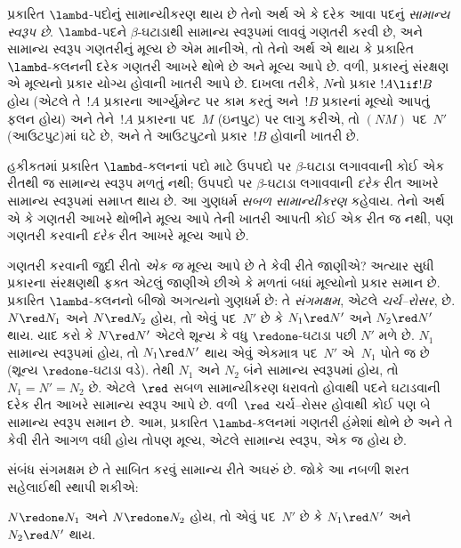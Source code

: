 પ્રકારિત $\lambd$-પદોનું સામાન્યીકરણ થાય છે તેનો
અર્થ એ કે દરેક આવા પદનું \emph{સામાન્ય સ્વરૂપ છે}.
$\lambd$-પદને $\beta$-ઘટાડાથી સામાન્ય સ્વરૂપમાં
લાવવું ગણતરી કરવી છે, અને સામાન્ય સ્વરૂપ
ગણતરીનું મૂલ્ય છે એમ માનીએ, તો તેનો અર્થ
એ થાય કે પ્રકારિત $\lambd$-કલનની દરેક ગણતરી
આખરે થોભે છે અને મૂલ્ય આપે છે. વળી,
પ્રકારનું સંરક્ષણ એ મૂલ્યનો પ્રકાર યોગ્ય
હોવાની ખાતરી આપે છે. દાખલા તરીકે, $N$નો
પ્રકાર $!A \lif !B$ હોય (એટલે તે~$!A$
પ્રકારના આર્ગ્યુમેન્ટ પર કામ કરતું અને~$!B$
પ્રકારનાં મૂલ્યો આપતું ફલન હોય) અને તેને~$!A$
પ્રકારના પદ~$M$ (ઇનપુટ) પર લાગુ કરીએ,
તો $(NM)$ પદ~$N'$ (આઉટપુટ)માં ઘટે છે,
અને તે આઉટપુટનો પ્રકાર~$!B$ હોવાની ખાતરી છે.


હકીકતમાં પ્રકારિત $\lambd$-કલનનાં પદો માટે
ઉપપદો પર $\beta$-ઘટાડા લગાવવાની કોઈ એક
રીતથી જ સામાન્ય સ્વરૂપ મળતું નથી; ઉપપદો
પર $\beta$-ઘટાડા લગાવવાની \emph{દરેક}
રીત આખરે સામાન્ય સ્વરૂપમાં સમાપ્ત થાય છે.
આ ગુણધર્મ \emph{સબળ સામાન્યીકરણ} કહેવાય.
તેનો અર્થ એ કે ગણતરી આખરે થોભીને મૂલ્ય
આપે તેની ખાતરી આપતી કોઈ એક રીત જ નથી,
પણ ગણતરી કરવાની \emph{દરેક} રીત
આખરે મૂલ્ય આપે છે.

ગણતરી કરવાની જુદી રીતો \emph{એક જ} મૂલ્ય
આપે છે તે કેવી રીતે જાણીએ? અત્યાર સુધી
પ્રકારના સંરક્ષણથી ફક્ત એટલું જાણીએ છીએ
કે મળતાં બધાં મૂલ્યોનો પ્રકાર સમાન છે.
પ્રકારિત $\lambd$-કલનનો બીજો અગત્યનો
ગુણધર્મ છે: તે \emph{સંગમક્ષમ}, એટલે
\emph{ચર્ચ--રોસર}, છે.
$N \red N_1$ અને $N \red N_2$ હોય,
તો એવું પદ~$N'$ છે કે $N_1 \red N'$
અને $N_2 \red N'$ થાય. યાદ કરો કે
$N \red N'$ એટલે શૂન્ય કે વધુ
$\redone$-ઘટાડા પછી $N'$ મળે છે.
$N_1$ સામાન્ય સ્વરૂપમાં હોય, તો
$N_1 \red N'$ થાય એવું એકમાત્ર પદ~$N'$
એ~$N_1$ પોતે જ છે (શૂન્ય
$\redone$-ઘટાડા વડે). તેથી $N_1$ અને
$N_2$ બંને સામાન્ય સ્વરૂપમાં હોય, તો
$N_1 = N' = N_2$ છે. એટલે~$\red$
સબળ સામાન્યીકરણ ધરાવતો હોવાથી પદને
ઘટાડવાની દરેક રીત આખરે સામાન્ય સ્વરૂપ આપે છે.
વળી~$\red$ ચર્ચ--રોસર હોવાથી કોઈ પણ
બે સામાન્ય સ્વરૂપ સમાન છે. આમ, પ્રકારિત
$\lambd$-કલનમાં ગણતરી હંમેશાં થોભે છે
અને તે કેવી રીતે આગળ વધી હોય તોપણ
મૂલ્ય, એટલે સામાન્ય સ્વરૂપ, એક જ હોય છે.

સંબંધ સંગમક્ષમ છે તે સાબિત કરવું સામાન્ય રીતે
અઘરું છે. જોકે આ નબળી શરત સહેલાઈથી
સ્થાપી શકીએ:

\begin{prop}
$N \redone N_1$ અને $N \redone N_2$ હોય,
તો એવું પદ~$N'$ છે કે $N_1 \red N'$
અને $N_2 \red N'$ થાય.
\end{prop}

